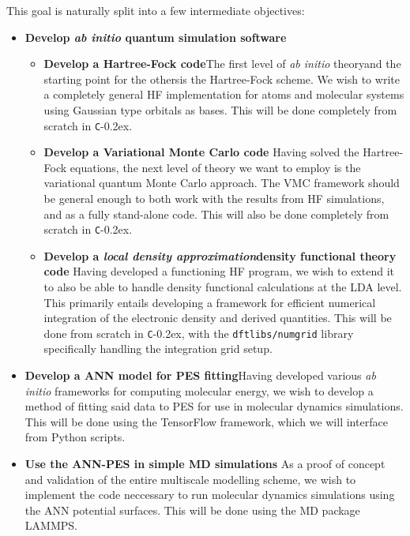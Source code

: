 \documentclass[twoside,english]{uiofysmaster}
\newcommand{\inlinecc}[1]{\lstinline[language={[std]c++}]{#1}}
\newcommand*\CC{\texttt{C}\kern-0.2ex\raisebox{0.2ex}{\scalebox{0.9}{+\kern-0.2ex+}}}
\begin{document}
This goal is naturally split into a few intermediate objectives:
\begin{itemize}
  \item[{\bf (a)}]{\bf Develop \emph{ab initio} quantum simulation software}
  \begin{itemize}
  \item[{\bf (1)}]{\bf  Develop a Hartree-Fock code}\newline The first level of \emph{ab initio} theory\textemdash and the starting point for the others\textemdash is the Hartree-Fock scheme. We wish to write a completely general HF implementation for atoms and molecular systems using Gaussian type orbitals as bases. This will be done completely from scratch in \CC{}.
  \item[{\bf (2)}] {\bf Develop a Variational Monte Carlo code} \newline Having solved the Hartree-Fock equations, the next level of theory we want to employ is the variational quantum Monte Carlo approach. The VMC framework should be general enough to both work with the results from HF simulations, and as a fully stand-alone code. This will also be done completely from scratch in \CC{}.
  \item[{\bf (3)}]{\bf Develop a \emph{local density approximation}\textemdash density functional theory code} \newline Having developed a functioning HF program, we wish to extend it to also be able to handle density functional calculations at the LDA level. This primarily entails developing a framework for efficient numerical integration of the electronic density and derived quantities. This will be done from scratch in \CC{}, with the \inlinecc{dftlibs/numgrid} library specifically handling the integration grid setup.
  \end{itemize}
  \item[{\bf (b)}] {\bf Develop a ANN model for PES fitting}\newline Having developed various \emph{ab initio} frameworks for computing molecular energy, we wish to develop a method of fitting said data to PES for use in molecular dynamics simulations. This will be done using the TensorFlow framework, which we will interface from Python scripts.
  \item[{\bf (c)}]{\bf Use the ANN-PES in simple MD simulations} \newline As a proof of concept and validation of the entire multiscale modelling scheme, we wish to implement the code neccessary to run molecular dynamics simulations using the ANN potential surfaces.  This will be done using the MD package LAMMPS.
\end{itemize}
\end{document}
